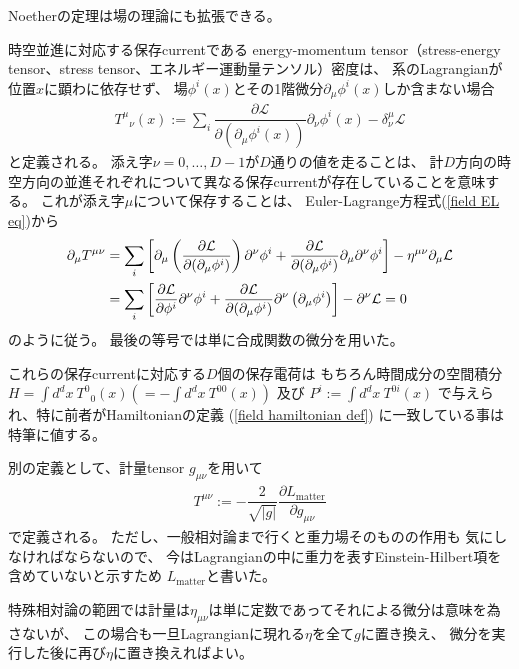 Noetherの定理は場の理論にも拡張できる。

時空並進に対応する保存currentである
energy-momentum tensor（stress-energy tensor、stress tensor、エネルギー運動量テンソル）密度は、
系のLagrangianが位置$x$に顕わに依存せず、
場$\phi^i(x)$とその1階微分$\partial_\mu \phi^i(x)$しか含まない場合
\begin{align}
  T^{\mu}{}_{\nu} (x)
:= \sum_i
	\dfrac{\partial \mathcal{L}}{\partial (\partial_\mu \phi^i (x) )}
	\partial_\nu \phi^i(x)
- \delta^{\mu}_{\nu} \mathcal{L}
\label{energy-momentum on flat space}
\end{align}
と定義される。
添え字$\nu = 0,\dots, D-1$が$D$通りの値を走ることは、
計$D$方向の時空方向の並進それぞれについて異なる保存currentが存在していることを意味する。
これが添え字$\mu$について保存することは、
Euler-Lagrange方程式(\ref{field EL eq})から
\begin{align}
	\partial_\mu T^{\mu \nu}
&= \sum_i \left[
		\partial_\mu \left(
			\dfrac{\partial \mathcal{L}}{\partial (\partial_\mu \phi^i)}
		\right)
		\partial^\nu \phi^i
	+	\dfrac{\partial \mathcal{L}}{\partial (\partial_\mu \phi^i)}
		\partial_\mu \partial^\nu \phi^i
	\right]
	- \eta^{\mu \nu} \partial_\mu \mathcal{L}
\notag\\&
= \sum_i \left[
		\dfrac{\partial \mathcal{L}}{\partial \phi^i}
		\partial^\nu \phi^i
	+	\dfrac{\partial \mathcal{L}}{\partial (\partial_\mu \phi^i )}
		\partial^\nu \left(
			\partial_\mu \phi^i
		\right)
	\right]
	- \partial^\nu \mathcal{L} = 0
\end{align}
のように従う。
最後の等号では単に合成関数の微分を用いた。

これらの保存currentに対応する$D$個の保存電荷は
もちろん時間成分の空間積分
$H = \int d^dx\ T^{0}{}_0 (x)
(= - \int d^dx\ T^{00} (x))$
及び
$P^i := \int d^dx\ T^{0i} (x)$
で与えられ、特に前者がHamiltonianの定義
(\ref{field hamiltonian def})
に一致している事は特筆に値する。

別の定義として、計量tensor $g_{\mu\nu}$を用いて
\begin{align}
  T^{\mu\nu}
:= - \dfrac{2}{\sqrt{|g|} }
    \dfrac{\partial L_{\mathrm{matter}}}{\partial g_{\mu\nu}}
\label{energy-momentum}
\end{align}
で定義される。
ただし、一般相対論まで行くと重力場そのものの作用も
気にしなければならないので、
今はLagrangianの中に重力を表すEinstein-Hilbert項を含めていないと示すため
$L_{\mathrm{matter}}$と書いた。

特殊相対論の範囲では計量は$\eta_{\mu \nu}$は単に定数であってそれによる微分は意味を為さないが、
この場合も一旦Lagrangianに現れる$\eta$を全て$g$に置き換え、
微分を実行した後に再び$\eta$に置き換えればよい。

